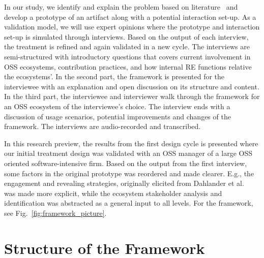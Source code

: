 \documentclass[a4paper]{llncs}
\begin{document}
In our study, we identify and explain the problem based on literature~\cite{munir2015open} and develop a prototype of an artifact along with a potential interaction set-up. As a validation model, we will use expert opinions where the prototype and interaction set-up is simulated through interviews. Based on the output of each interview, the treatment is refined and again validated in a new cycle. The interviews are semi-structured with introductory questions that covers current involvement in OSS ecosystems, contribution practices, and how internal RE functions relative the ecosystems'. In the second part, the framework is presented for the interviewee with an explanation and open discussion on its structure and content. In the third part, the interviewee and interviewer walk through the framework for an OSS ecosystem of the interviewee's choice. The interview ends with a discussion of usage scenarios, potential improvements and changes of the framework. The interviews are audio-recorded and transcribed.

In this research preview, the results from the first design cycle is presented where our initial treatment design was validated with an OSS manager of a large OSS oriented software-intensive firm. Based on the output from the first interview, some factors in the original prototype was reordered and made clearer. E.g., the engagement and revealing strategies, originally elicited from Dahlander et al.~\cite{dahlander2008firms} was made more explicit, while the ecosystem stakeholder analysis and identification was abstracted as a general input to all levels. For the framework, see Fig.~\ref{fig:framework_picture}.

\vspace{-0.3cm}
\section{Structure of the Framework}
\vspace{-0.3cm}
\end{document}
